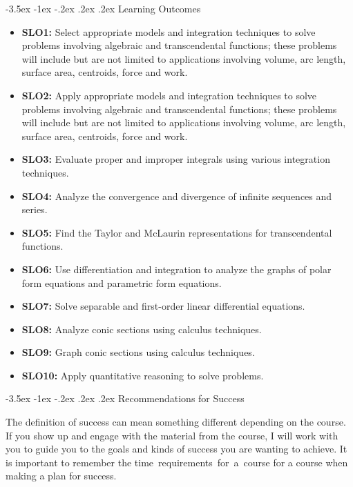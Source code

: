 \documentclass[11pt]{article}
\makeatletter
\renewcommand\section{\@startsection{section}{1}{0pt}%
  {-3.5ex \@plus -1ex \@minus -.2ex}%
  {.2ex \@plus.2ex}%
  {\normalfont\Large\bfseries}} %
\makeatother
\begin{document}
\section{Learning Outcomes}

\begin{itemize}
\item \textbf{SLO1:} Select appropriate models and integration techniques to solve problems involving algebraic and transcendental functions; these problems will include but are not limited to applications involving volume, arc length, surface area, centroids, force and work.
\item \textbf{SLO2:} Apply appropriate models and integration techniques to solve problems involving algebraic and transcendental functions; these problems will include but are not limited to applications involving volume, arc length, surface area, centroids, force and work.
\item \textbf{SLO3:} Evaluate proper and improper integrals using various integration techniques.
\item \textbf{SLO4:} Analyze the convergence and divergence of infinite sequences and series.
\item \textbf{SLO5:} Find the Taylor and McLaurin representations for transcendental functions.
\item \textbf{SLO6:} Use differentiation and integration to analyze the graphs of polar form equations and parametric form equations.
\item \textbf{SLO7:} Solve separable and first-order linear differential equations.
\item \textbf{SLO8:} Analyze conic sections using calculus techniques.
\item \textbf{SLO9:} Graph conic sections using calculus techniques.
\item \textbf{SLO10:} Apply quantitative reasoning to solve problems.
\end{itemize}

\section{Recommendations for Success}

The definition of success can mean something different depending on the course. If you show up and engage with the material from the course, I will work with you to guide you to the goals and kinds of success you are wanting to achieve. It is important to remember the time~requirements~for~a~course for a course when making a plan for success.
\end{document}
